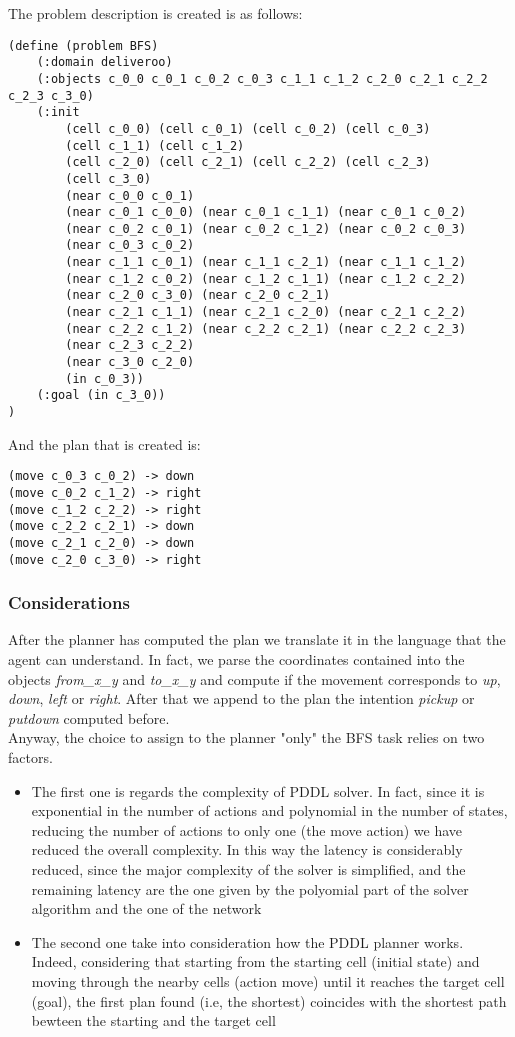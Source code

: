 \documentclass[a4paper, 11pt]{article}
\begin{document}
The problem description is created is as follows:
\begin{verbatim}
(define (problem BFS)
    (:domain deliveroo)
    (:objects c_0_0 c_0_1 c_0_2 c_0_3 c_1_1 c_1_2 c_2_0 c_2_1 c_2_2 c_2_3 c_3_0)
    (:init 
        (cell c_0_0) (cell c_0_1) (cell c_0_2) (cell c_0_3)
        (cell c_1_1) (cell c_1_2)
        (cell c_2_0) (cell c_2_1) (cell c_2_2) (cell c_2_3)
        (cell c_3_0)
        (near c_0_0 c_0_1)
        (near c_0_1 c_0_0) (near c_0_1 c_1_1) (near c_0_1 c_0_2)
        (near c_0_2 c_0_1) (near c_0_2 c_1_2) (near c_0_2 c_0_3)
        (near c_0_3 c_0_2)
        (near c_1_1 c_0_1) (near c_1_1 c_2_1) (near c_1_1 c_1_2)
        (near c_1_2 c_0_2) (near c_1_2 c_1_1) (near c_1_2 c_2_2)
        (near c_2_0 c_3_0) (near c_2_0 c_2_1)
        (near c_2_1 c_1_1) (near c_2_1 c_2_0) (near c_2_1 c_2_2)
        (near c_2_2 c_1_2) (near c_2_2 c_2_1) (near c_2_2 c_2_3)
        (near c_2_3 c_2_2)
        (near c_3_0 c_2_0)
        (in c_0_3))
    (:goal (in c_3_0))
)
\end{verbatim}

And the plan that is created is:
\begin{verbatim}
(move c_0_3 c_0_2) -> down
(move c_0_2 c_1_2) -> right
(move c_1_2 c_2_2) -> right
(move c_2_2 c_2_1) -> down
(move c_2_1 c_2_0) -> down
(move c_2_0 c_3_0) -> right
\end{verbatim}

\subsubsection{Considerations}

After the planner has computed the plan we translate it in the language that the agent can understand. In fact, we parse the coordinates contained into the objects \emph{from\_x\_y} and \emph{to\_x\_y} and compute if the movement corresponds to \emph{up}, \emph{down}, \emph{left} or \emph{right}. After that we append to the plan the intention \emph{pickup} or \emph{putdown} computed before.\\

Anyway, the choice to assign to the planner "only" the BFS task relies on two factors.
\begin{itemize}
    \item The first one is regards the complexity of PDDL solver. In fact, since it is exponential in the number of actions and polynomial in the number of states, reducing the number of actions to only one (the move action) we have reduced the overall complexity. In this way the latency is considerably reduced, since the major complexity of the solver is simplified, and the remaining latency are the one given by the polyomial part of the solver algorithm and the one of the network
    \item The second one take into consideration how the PDDL planner works. Indeed, considering that starting from the starting cell (initial state) and moving through the nearby cells (action move) until it reaches the target cell (goal), the first plan found (i.e, the shortest) coincides with the shortest path bewteen the starting and the target cell
\end{itemize}
\end{document}
